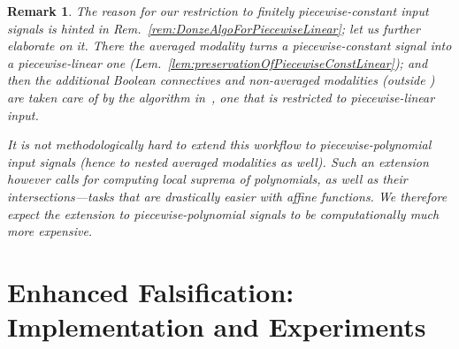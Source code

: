 \documentclass[envcountsect,orivec]{llncs} \usepackage{etex} \usepackage[]{graphicx}
\newtheorem{myremark}[mytheorem]{Remark}
\begin{document}
\begin{myremark}
 The reason for our restriction to finitely piecewise-constant input
 signals is hinted in Rem.~\ref{rem:DonzeAlgoForPiecewiseLinear}; let us
 further elaborate on it.
 There the averaged modality  turns a piecewise-constant signal into a
 piecewise-linear one
 (Lem.~\ref{lem:preservationOfPiecewiseConstLinear}); and then the
 additional Boolean connectives and non-averaged
 modalities (outside  ) are taken care of by the algorithm
 in~\cite{DBLP:conf/cav/DonzeFM13}, one that is restricted
 to piecewise-linear input.

 It is not methodologically hard to extend this workflow to
 piecewise-\emph{polynomial} input signals (hence to nested averaged
 modalities as well). Such an extension however calls
 for computing local suprema of polynomials, as well as their
 intersections---tasks that are drastically easier with affine
 functions. We therefore expect  the extension to
 piecewise-polynomial signals to be computationally
 much more expensive.
\end{myremark}





































\section{Enhanced Falsification: Implementation and Experiments}
\label{sec:experiments}
\end{document}
